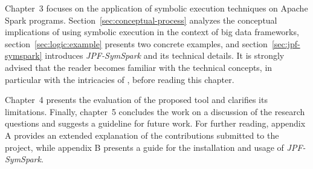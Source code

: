 Chapter~3 focuses on the application of symbolic execution techniques on Apache Spark programs. Section~\ref{sec:conceptual-process} analyzes the conceptual implications of using symbolic execution in the context of big data frameworks, section~\ref{sec:logic:example} presents two concrete examples, and section~\ref{sec:jpf-symspark} introduces \textit{JPF-SymSpark} and its technical details. It is strongly advised that the reader becomes familiar with the technical concepts, in particular with the intricacies of \jpf{}, before reading this chapter.

Chapter~4 presents the evaluation of the proposed tool and clarifies its limitations. Finally, chapter~5 concludes the work on a discussion of the research questions and suggests a guideline for future work. For further reading, appendix A provides an extended explanation of the contributions submitted to the \spf{} project, while appendix B presents a guide for the installation and usage of \textit{JPF-SymSpark}.

 

